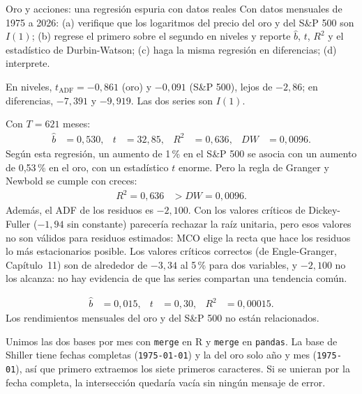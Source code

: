 \begin{ejresuelto}{Oro y acciones: una regresión espuria con datos reales}\label{ej:oroespuria}
\enunciado Con datos mensuales de 1975 a 2026: (a) verifique que los logaritmos del precio del oro y del
S\&P 500 son $I(1)$; (b) regrese el primero sobre el segundo en niveles y reporte $\hat b$, $t$, $R^2$ y el
estadístico de Durbin-Watson; (c) haga la misma regresión en diferencias; (d) interprete.

\solucion
{} En niveles, $t_{\mathrm{ADF}}=-0{,}861$ (oro) y $-0{,}091$ (S\&P 500),
lejos de $-2{,}86$; en diferencias, $-7{,}391$ y $-9{,}919$. Las dos series son $I(1)$.

 Con $T=621$ meses:
\begin{align*}
  \hat b &= 0{,}530, & t &= 32{,}85, & R^2 &= 0{,}636, & DW &= 0{,}0096 .
\end{align*}
Según esta regresión, un aumento de 1\,\% en el S\&P 500 se asocia con un aumento de 0,53\,\% en el oro, con
un estadístico $t$ enorme. Pero la regla de Granger y Newbold se cumple con creces:
\begin{align*}
  R^2 = 0{,}636 &> DW = 0{,}0096 .
\end{align*}
Además, el ADF de los residuos es $-2{,}100$. Con los valores críticos de Dickey-Fuller ($-1{,}94$ sin
constante) parecería rechazar la raíz unitaria, pero esos valores no son válidos para residuos estimados: MCO
elige la recta que hace los residuos lo más estacionarios posible. Los valores críticos correctos (de
Engle-Granger, Capítulo~11) son de alrededor de $-3{,}34$ al 5\,\% para dos variables, y $-2{,}100$ no los
alcanza: no hay evidencia de que las series compartan una tendencia común.

\begin{align*}
  \hat b &= 0{,}015, & t &= 0{,}30, & R^2 &= 0{,}00015 .
\end{align*}
Los rendimientos mensuales del oro y del S\&P 500 no están relacionados.


\RvsPy Unimos las dos bases por mes con \texttt{merge} en R y \texttt{merge} en \texttt{pandas}. La base de
Shiller tiene fechas completas (\texttt{1975-01-01}) y la del oro solo año y mes (\texttt{1975-01}), así que
primero extraemos los siete primeros caracteres. Si se unieran por la fecha completa, la intersección
quedaría vacía sin ningún mensaje de error.


\end{ejresuelto}

